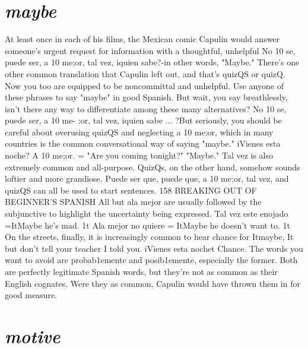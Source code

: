 \documentclass[14pt,a4paper,oneside]{memoir}
\begin{document}
{{{{\section{\emph{maybe}}

At least once in each of his films, the Mexican comic Capulin would answer someone's urgent request for information with a
thoughtful, unhelpful No 10 se, puede ser, a 10 me;or, tal vez, iquien
sabe?-in other words, "Maybe." There's one other common translation that Capulin left out, and that's quizQS or quizQ. Now you too
are equipped to be noncommittal and unhelpful. Use anyone of these
phrases to say "maybe" in good Spanish.
But wait, you say breathlessly, isn't there any way to differentiate among these many alternatives? No 10 se, puede ser, a 10 me-
;or, tal vez, iquien sabe ... ?But seriously, you should be careful about
overusing quizQS and neglecting a 10 me;or, which in many countries
is the common conversational way of saying "maybe." iVienes esta
noche? A 10 me;or. = "Are you coming tonight?" "Maybe." Tal vez is
also extremely common and all-purpose. QuizQs, on the other hand,
somehow sounds loftier and more grandiose. Puede ser que, puede
que, a 10 me;or, tal vez, and quizQS can all be used to start sentences.
158 BREAKING OUT OF BEGINNER'S SPANISH
All but ala mejor are usually followed by the subjunctive to highlight
the uncertainty being expressed. Tal vez este enojado =ItMaybe he's
mad. 1t Ala mejor no quiere = ItMaybe he doesn't want to. 1t On the
streets, finally, it is increasingly common to hear chance for Itmaybe, It
but don't tell your teacher I told you. iVienes esta nochet Chance. The
words you want to avoid are probab1emente and posib1emente, especially the former. Both are perfectly legitimate Spanish words, but
they're not as common as their English cognates. Were they as common, Capulin would have thrown them in for good measure.

\section{\emph{motive}}

}}}}
\end{document}
